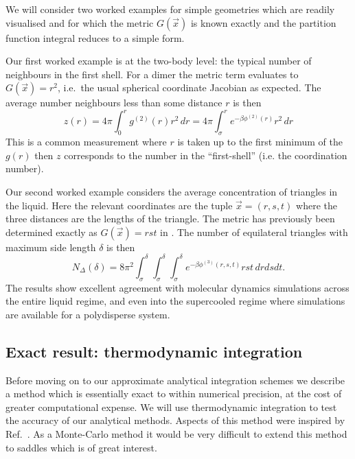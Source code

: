 \documentclass[11pt,twoside]{report}
\begin{document}
We will consider two worked examples for simple geometries which are readily visualised and for which the metric $G(\vec{x})$ is known exactly and the partition function integral reduces to a simple form.

Our first worked example is at the two-body level: the typical number of neighbours in the first shell.
For a dimer the metric term evaluates to $G(\vec{x}) = r^2$, i.e.\ the usual spherical coordinate Jacobian as expected.
The average number neighbours less than some distance $r$ is then
\begin{equation}
  z(r)
  = 4\pi \int_0^r g^{(2)}(r) r^2 \, dr
  = 4\pi \int_\sigma^r e^{-\beta \phi^{(2)}(r)} r^2 \, dr
\end{equation}
This is a common measurement where $r$ is taken up to the first minimum of the $g(r)$ then $z$ corresponds to the number in the ``first-shell'' (i.e. the coordination number).

Our second worked example considers the average concentration of triangles in the liquid.
Here the relevant coordinates are the tuple $\vec{x} = (r,s,t)$ where the three distances are the lengths of the triangle.
The metric has previously been determined exactly as $G(\vec{x}) = rst$ in \cite{?}.
The number of equilateral triangles with maximum side length $\delta$ is then
\begin{equation}
  N_\Delta(\delta)
  =
  8\pi^2 \int_\sigma^\delta\int_\sigma^\delta\int_\sigma^\delta
  e^{-\beta\phi^{(3)}(r,s,t)} rst \, dr ds dt.
\end{equation}
The results show excellent agreement with molecular dynamics simulations across the entire liquid regime, and even into the supercooled regime where simulations are available for a polydisperse system.

\subsection{Exact result: thermodynamic integration}


Before moving on to our approximate analytical integration schemes we describe a method which is essentially exact to within numerical precision, at the cost of greater computational expense.
We will use thermodynamic integration to test the accuracy of our analytical methods.
Aspects of this method were inspired by Ref.\ \cite{Schilling2009}.
As a Monte-Carlo method it would be very difficult to extend this method to saddles which is of great interest.
\end{document}
